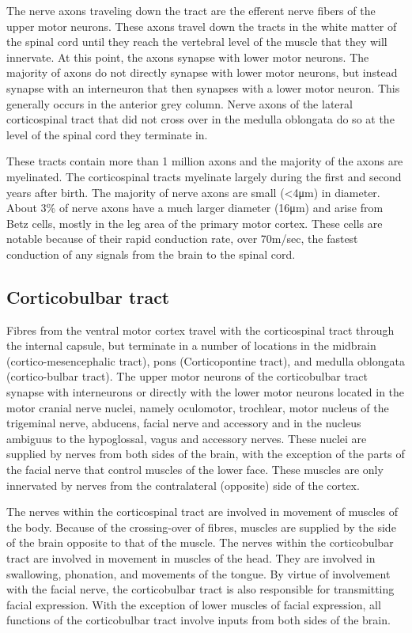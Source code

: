 The nerve axons traveling down the tract are the efferent nerve fibers of the upper motor neurons. These axons travel down the tracts in the white matter of the spinal cord until they reach the vertebral level of the muscle that they will innervate. At this point, the axons synapse with lower motor neurons. The majority of axons do not directly synapse with lower motor neurons, but instead synapse with an interneuron that then synapses with a lower motor neuron. This generally occurs in the anterior grey column. Nerve axons of the lateral corticospinal tract that did not cross over in the medulla oblongata do so at the level of the spinal cord they terminate in.

These tracts contain more than 1 million axons and the majority of the axons are myelinated. The corticospinal tracts myelinate largely during the first and second years after birth. The majority of nerve axons are small (\textless{}4μm) in diameter. About 3\% of nerve axons have a much larger diameter (16μm) and arise from Betz cells, mostly in the leg area of the primary motor cortex. These cells are notable because of their rapid conduction rate, over 70m/sec, the fastest conduction of any signals from the brain to the spinal cord.

\hypertarget{corticobulbar-tract}{%
\subsection{Corticobulbar tract}\label{corticobulbar-tract}}

Fibres from the ventral motor cortex travel with the corticospinal tract through the internal capsule, but terminate in a number of locations in the midbrain (cortico-mesencephalic tract), pons (Corticopontine tract), and medulla oblongata (cortico-bulbar tract). The upper motor neurons of the corticobulbar tract synapse with interneurons or directly with the lower motor neurons located in the motor cranial nerve nuclei, namely oculomotor, trochlear, motor nucleus of the trigeminal nerve, abducens, facial nerve and accessory and in the nucleus ambiguus to the hypoglossal, vagus and accessory nerves. These nuclei are supplied by nerves from both sides of the brain, with the exception of the parts of the facial nerve that control muscles of the lower face. These muscles are only innervated by nerves from the contralateral (opposite) side of the cortex.

The nerves within the corticospinal tract are involved in movement of muscles of the body. Because of the crossing-over of fibres, muscles are supplied by the side of the brain opposite to that of the muscle. The nerves within the corticobulbar tract are involved in movement in muscles of the head. They are involved in swallowing, phonation, and movements of the tongue. By virtue of involvement with the facial nerve, the corticobulbar tract is also responsible for transmitting facial expression. With the exception of lower muscles of facial expression, all functions of the corticobulbar tract involve inputs from both sides of the brain.

